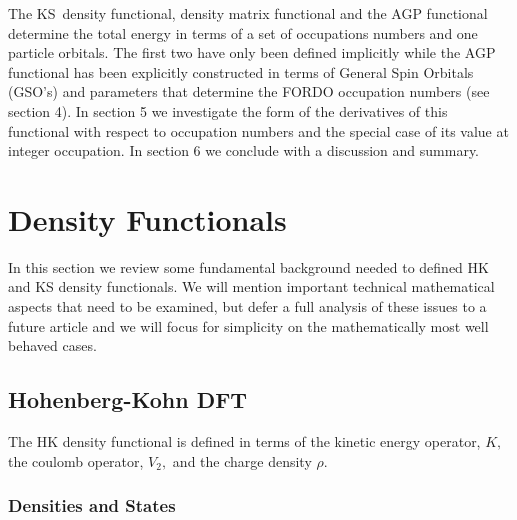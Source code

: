 \documentclass[aps,preprint]{revtex4}%
\begin{document}
The KS\ density functional, density matrix functional and the AGP functional
determine the total energy in terms of a set of occupations numbers and one
particle orbitals. The first two have only been defined implicitly while the
AGP functional has been explicitly constructed \cite{Weiner&Ortiz2005} in
terms of General Spin Orbitals (GSO's) and parameters that determine the FORDO
occupation numbers (see section 4). In section 5 we investigate the form of
the derivatives of this functional with respect to occupation numbers and the
special case of its value at integer occupation. In section 6 we conclude with
a discussion and summary.

\section{Density Functionals \label{Standard}}

In this section we review some fundamental background needed to defined HK and
KS density functionals. We will mention important technical mathematical
aspects that need to be examined, but defer a full analysis of these issues to
a future article and we will focus for simplicity on the mathematically most
well behaved cases.

\subsection{Hohenberg-Kohn DFT}

The HK density functional is defined in terms of the kinetic energy operator,
$K,$ the coulomb operator, $V_{2},$ and the charge density $\rho$.

\subsubsection{Densities and States}
\end{document}
